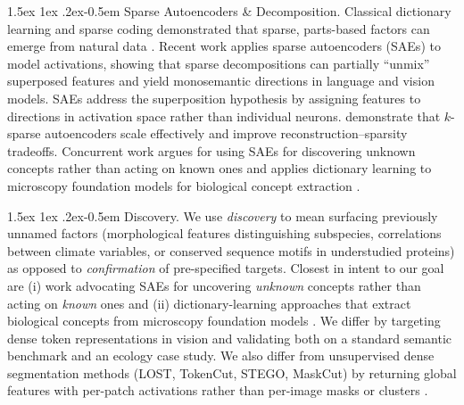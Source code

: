 \documentclass[10pt,twocolumn,letterpaper]{article}
\makeatletter
\renewcommand{\paragraph}{%
  \@startsection{paragraph}{4}%
  {\z@}{1.5ex \@plus 1ex \@minus .2ex}{-0.5em}%
  {\normalfont\normalsize\bfseries}%
}
\makeatother
\begin{document}
\paragraph{Sparse Autoencoders \& Decomposition.}
Classical dictionary learning and sparse coding demonstrated that sparse, parts-based factors can emerge from natural data \citep{olshausen1996nature,aharon2006ksvd,lee1999nmf}.
Recent work applies sparse autoencoders (SAEs) to model activations, showing that sparse decompositions can partially ``unmix'' superposed features and yield monosemantic directions \citep{elhage2022superposition,bricken2023monosemanticity,gao2025scaling} in language and vision models.
SAEs address the superposition hypothesis \citep{elhage2022superposition} by assigning features to directions in activation space rather than individual neurons.
\citeauthor{gao2025scaling} demonstrate that $k$-sparse autoencoders scale effectively and improve reconstruction--sparsity tradeoffs.
Concurrent work argues for using SAEs for discovering unknown concepts rather than acting on known ones \citep{peng2025unknown} and applies dictionary learning to microscopy foundation models for biological concept extraction \citep{donhauser2024towards}.

\paragraph{Discovery.}
We use \emph{discovery} to mean surfacing previously unnamed factors (morphological features distinguishing subspecies, correlations between climate variables, or conserved sequence motifs in understudied proteins) as opposed to \emph{confirmation} of pre-specified targets.
Closest in intent to our goal are (i) work advocating SAEs for uncovering \emph{unknown} concepts rather than acting on \emph{known} ones \citep{peng2025unknown} and (ii) dictionary-learning approaches that extract biological concepts from microscopy foundation models \citep{donhauser2024towards}.
We differ by targeting dense token representations in vision and validating both on a standard semantic benchmark and an ecology case study.
We also differ from unsupervised dense segmentation methods (LOST, TokenCut, STEGO, MaskCut) by returning global features with per-patch activations rather than per-image masks or clusters \citep{simeoni2021lost,wang2023tokencut,hamilton2022stego,wang2023maskcut}.
\end{document}
